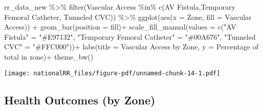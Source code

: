 \documentclass[
  letterpaper,
  DIV=11,
  numbers=noendperiod]{scrartcl}
\newenvironment{Shaded}{\begin{snugshade}}{\end{snugshade}}
\newcommand{\AttributeTok}[1]{\textcolor[rgb]{0.40,0.45,0.13}{#1}}
\newcommand{\FunctionTok}[1]{\textcolor[rgb]{0.28,0.35,0.67}{#1}}
\newcommand{\NormalTok}[1]{\textcolor[rgb]{0.00,0.23,0.31}{#1}}
\newcommand{\OtherTok}[1]{\textcolor[rgb]{0.00,0.23,0.31}{#1}}
\newcommand{\SpecialCharTok}[1]{\textcolor[rgb]{0.37,0.37,0.37}{#1}}
\newcommand{\StringTok}[1]{\textcolor[rgb]{0.13,0.47,0.30}{#1}}
\begin{document}
\begin{Shaded}
\begin{Highlighting}[]
\NormalTok{rr\_data\_new }\SpecialCharTok{\%\textgreater{}\%} 
  \FunctionTok{filter}\NormalTok{(}\StringTok{\textasciigrave{}}\AttributeTok{Vascular Access}\StringTok{\textasciigrave{}} \SpecialCharTok{\%in\%} \FunctionTok{c}\NormalTok{(}\StringTok{\textquotesingle{}AV Fistula\textquotesingle{}}\NormalTok{,}\StringTok{\textquotesingle{}Temporary Femoral Catheter\textquotesingle{}}\NormalTok{,}
                                  \StringTok{\textquotesingle{}Tunneled CVC\textquotesingle{}}\NormalTok{)) }\SpecialCharTok{\%\textgreater{}\%}
  \FunctionTok{ggplot}\NormalTok{(}\FunctionTok{aes}\NormalTok{(}\AttributeTok{x =}\NormalTok{ Zone, }\AttributeTok{fill =} \StringTok{\textasciigrave{}}\AttributeTok{Vascular Access}\StringTok{\textasciigrave{}}\NormalTok{)) }\SpecialCharTok{+}
  \FunctionTok{geom\_bar}\NormalTok{(}\AttributeTok{position =} \StringTok{\textquotesingle{}fill\textquotesingle{}}\NormalTok{)}\SpecialCharTok{+}
  \FunctionTok{scale\_fill\_manual}\NormalTok{(}\AttributeTok{values =} \FunctionTok{c}\NormalTok{(}\StringTok{"AV Fistula"} \OtherTok{=} \StringTok{"\#E97132"}\NormalTok{,}
                              \StringTok{"Temporary Femoral Catheter"} \OtherTok{=} \StringTok{"\#00A676"}\NormalTok{,}
                              \StringTok{"Tunneled CVC"} \OtherTok{=} \StringTok{"\#FFC000"}\NormalTok{))}\SpecialCharTok{+}
  \FunctionTok{labs}\NormalTok{(}\AttributeTok{title =} \StringTok{\textquotesingle{}Vascular Access by Zone\textquotesingle{}}\NormalTok{,}
       \AttributeTok{y =} \StringTok{\textquotesingle{}Percentage of total in zone\textquotesingle{}}\NormalTok{)}\SpecialCharTok{+}
  \FunctionTok{theme\_bw}\NormalTok{()}
\end{Highlighting}
\end{Shaded}

\texttt{[image: nationalRR\_files/figure-pdf/unnamed-chunk-14-1.pdf]}

\subsection{Health Outcomes (by Zone)}\label{health-outcomes-by-zone}
\end{document}
